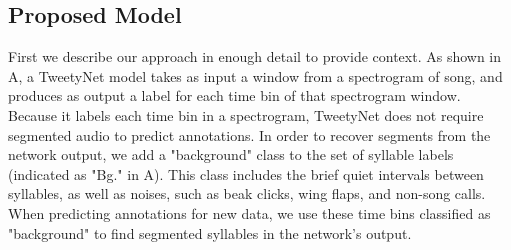 \documentclass[9pt,lineno]{elife}
\begin{document}
\FloatBarrier

\subsection{Proposed Model}
\label{Proposed Model}
 
First we describe our approach in enough detail 
to provide context. As shown in A,
a TweetyNet model takes as input a window from a spectrogram of song,  
and produces as output a label for each time bin of that spectrogram window.
Because it labels each time bin in a spectrogram, 
TweetyNet does not require segmented audio to predict annotations.
In order to recover segments from the network output, 
we add a "background" class to the set of syllable labels 
(indicated as "Bg." in A). 
This class includes the brief quiet intervals between syllables,  
as well as noises, such as beak clicks, wing flaps, and non-song calls. 
When predicting annotations for new data, 
we use these time bins classified as "background" 
to find segmented syllables in the network's output.
\end{document}
